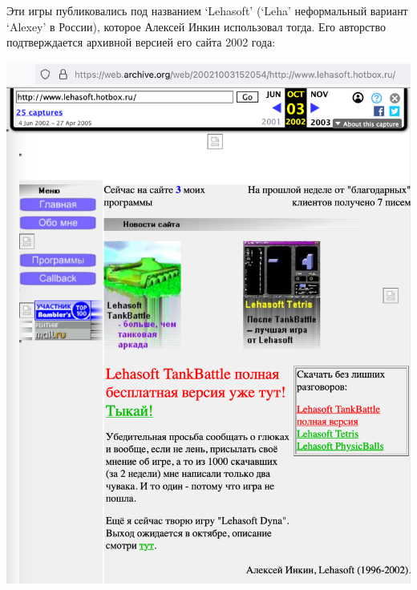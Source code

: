 Эти игры публиковались под названием `Lehasoft'
(`Leha' неформальный вариант `Alexey' в России),
которое Алексей Инкин использовал тогда.
Его авторство подтверждается архивной версией его сайта 2002 года:



\begin{center}
    \includegraphics[width=\textwidth]{lehasoft-hotbox}
\end{center}

\pagebreak
